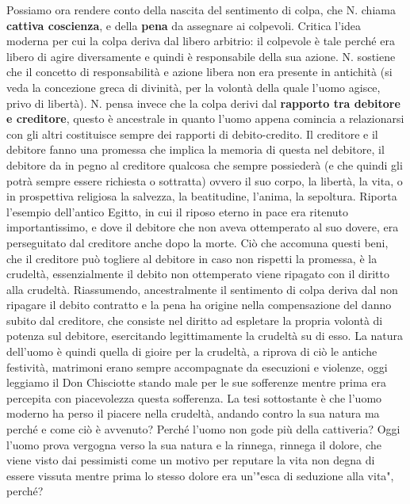 \documentclass[10pt,a4paper]{article}
\begin{document}
Possiamo ora rendere conto della nascita del sentimento di colpa, che N. chiama \textbf{cattiva coscienza}, e della \textbf{pena} da assegnare ai colpevoli. Critica l'idea moderna per cui la colpa deriva dal libero arbitrio: il colpevole è tale perché era libero di agire diversamente e quindi è responsabile della sua azione. N. sostiene che il concetto di responsabilità e azione libera non era presente in antichità (si veda la concezione greca di divinità, per la volontà della quale l'uomo agisce, privo di libertà). N. pensa invece che la colpa derivi dal \textbf{rapporto tra debitore e creditore}, questo è ancestrale in quanto l'uomo appena comincia a relazionarsi con gli altri costituisce sempre dei rapporti di debito-credito. Il creditore e il debitore fanno una promessa che implica la memoria di questa nel debitore, il debitore da in pegno al creditore qualcosa che sempre possiederà (e che quindi gli potrà sempre essere richiesta o sottratta) ovvero il suo corpo, la libertà, la vita, o in prospettiva religiosa la salvezza, la beatitudine, l'anima, la sepoltura. Riporta l'esempio dell'antico Egitto, in cui il riposo eterno in pace era ritenuto importantissimo, e dove il debitore che non aveva ottemperato al suo dovere, era perseguitato dal creditore anche dopo la morte. Ciò che accomuna questi beni, che il creditore può togliere al debitore in caso non rispetti la promessa, è la crudeltà, essenzialmente il debito non ottemperato viene ripagato con il diritto alla crudeltà. Riassumendo, ancestralmente il sentimento di colpa deriva dal non ripagare il debito contratto e la pena ha origine nella compensazione del danno subito dal creditore, che consiste nel diritto ad espletare la propria volontà di potenza sul debitore, esercitando legittimamente la crudeltà su di esso. La natura dell'uomo è quindi quella di gioire per la crudeltà, a riprova di ciò le antiche festività, matrimoni erano sempre accompagnate da esecuzioni e violenze, oggi leggiamo il Don Chisciotte stando male per le sue sofferenze mentre prima era percepita con piacevolezza questa sofferenza. La tesi sottostante è che l'uomo moderno ha perso il piacere nella crudeltà, andando contro la sua natura ma perché e come ciò è avvenuto? Perché l'uomo non gode più della cattiveria? Oggi l'uomo prova vergogna verso la sua natura e la rinnega, rinnega il dolore, che viene visto dai pessimisti come un motivo per reputare la vita non degna di essere vissuta mentre prima lo stesso dolore era un'"esca di seduzione alla vita", perché?
\end{document}

